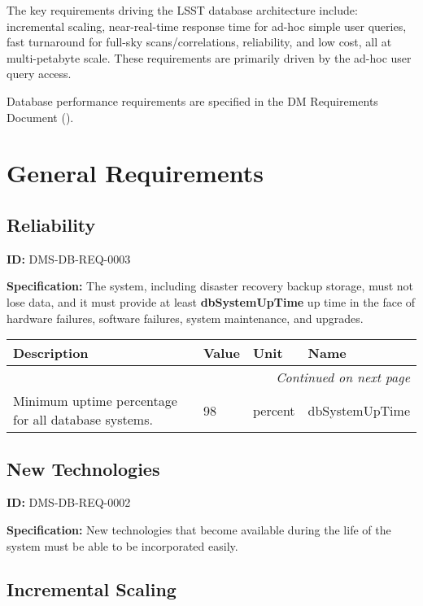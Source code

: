 \documentclass[SE,toc,lsstdraft]{lsstdoc}
\date{2017-06-30}
\makeatletter
\newcommand{\paramname}[1]{\hspace{0pt}#1}
\newcommand{\unitname}[1]{\hspace{0pt}#1}
\newenvironment{parameters}[0]{%
\setlength\LTleft{0pt}
\setlength\LTright{\fill}
\begin{small}
\begin{longtable}[]{|p{0.49\textwidth}|l|p{0.6in}|p{1.70in}@{}|}

\hline \textbf{Description} & \textbf{Value} & \textbf{Unit} & \textbf{Name} \\ \hline
\endhead

\hline \multicolumn{4}{r}{\emph{Continued on next page}} \\
\endfoot

\hline\hline
\endlastfoot
}{%
\hline
\end{longtable}
\end{small}
}
\makeatother
\begin{document}
\maketitle

The key requirements driving the LSST database architecture include: incremental scaling, near-real-time response time for ad-hoc simple user queries, fast turnaround for full-sky scans/correlations, reliability, and low cost, all at multi-petabyte scale. These requirements are primarily driven by the ad-hoc user query access.

Database performance requirements are specified in the DM Requirements Document ().

\section{General Requirements}

\subsection{Reliability}

\label{DMS-DB-REQ-0003}
\textbf{ID:} DMS-DB-REQ-0003

\textbf{Specification:}
The system, including disaster recovery backup storage, must not lose data, and it must provide at least \textbf{dbSystemUpTime} up time in the face of hardware failures, software failures, system maintenance, and upgrades.

\begin{parameters}
Minimum uptime percentage for all database systems.
&
98
&
\unitname{%
percent
}
&
\paramname{%
dbSystemUpTime
} \\\hline
\end{parameters}

\subsection{New Technologies}

\label{DMS-DB-REQ-0002}
\textbf{ID:} DMS-DB-REQ-0002

\textbf{Specification:}
New technologies that become available during the life of the system must be able to be incorporated easily.

\subsection{Incremental Scaling}
\end{document}
